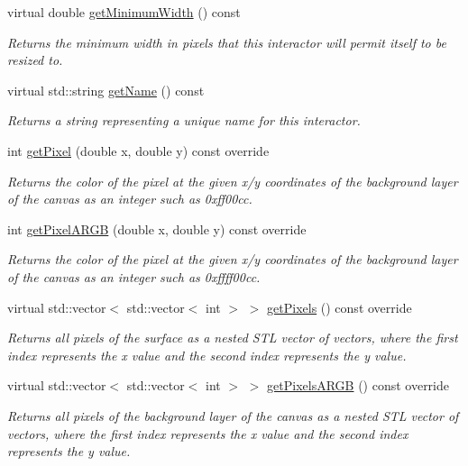 \begin{DoxyCompactItemize}
virtual double \mbox{\hyperlink{classsgl_1_1GInteractor_a59e668114fe3d49d2a0f28deb258f7c8}{get\+Minimum\+Width}} () const
\begin{DoxyCompactList}\small\item\em Returns the minimum width in pixels that this interactor will permit itself to be resized to. \end{DoxyCompactList}\item 
virtual std\+::string \mbox{\hyperlink{classsgl_1_1GInteractor_a8a60438a5b55d0b2ceb35c8674b9d8c5}{get\+Name}} () const
\begin{DoxyCompactList}\small\item\em Returns a string representing a unique name for this interactor. \end{DoxyCompactList}\item 
int \mbox{\hyperlink{classsgl_1_1GCanvas_a342aaa6de62a4a324a2e4f3921db1d3e}{get\+Pixel}} (double x, double y) const override
\begin{DoxyCompactList}\small\item\em Returns the color of the pixel at the given x/y coordinates of the background layer of the canvas as an integer such as 0xff00cc. \end{DoxyCompactList}\item 
int \mbox{\hyperlink{classsgl_1_1GCanvas_ae28117ec01d58208d381fba886030850}{get\+Pixel\+A\+R\+GB}} (double x, double y) const override
\begin{DoxyCompactList}\small\item\em Returns the color of the pixel at the given x/y coordinates of the background layer of the canvas as an integer such as 0xffff00cc. \end{DoxyCompactList}\item 
virtual std\+::vector$<$ std\+::vector$<$ int $>$ $>$ \mbox{\hyperlink{classsgl_1_1GCanvas_a41bea2a0b9f562b69f754a8b9bf4e711}{get\+Pixels}} () const override
\begin{DoxyCompactList}\small\item\em Returns all pixels of the surface as a nested S\+TL vector of vectors, where the first index represents the x value and the second index represents the y value. \end{DoxyCompactList}\item 
virtual std\+::vector$<$ std\+::vector$<$ int $>$ $>$ \mbox{\hyperlink{classsgl_1_1GCanvas_a07228643bf746aad52b1976626bc1a10}{get\+Pixels\+A\+R\+GB}} () const override
\begin{DoxyCompactList}\small\item\em Returns all pixels of the background layer of the canvas as a nested S\+TL vector of vectors, where the first index represents the x value and the second index represents the y value. \end{DoxyCompactList}\item 

\end{DoxyCompactItemize}
